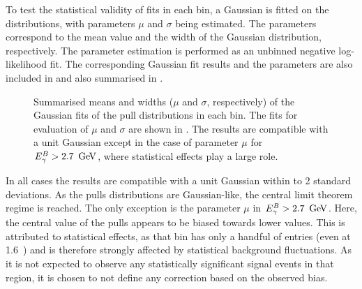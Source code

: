 To test the statistical validity of \Mbc fits in each bin, a Gaussian \PDF is fitted on the distributions, with parameters $\mu$ and $\sigma$ being estimated.
The parameters correspond to the mean value and the width of the Gaussian distribution, respectively.
The parameter estimation is performed as an unbinned negative log-likelihood fit.
The corresponding Gaussian fit results and the parameters are also included in  and also summarised in .
\begin{figure}[htbp!]
    \centering
    \caption{\label{fig:mean_sigma_pulls}Summarised means and widths ($\mu$ and $\sigma$, respectively) of the Gaussian fits of
    the pull distributions in each \EB bin.
    The fits for evaluation of $\mu$ and $\sigma$ are shown in .
    The results are compatible with a unit Gaussian except in the case of parameter $\mu$ for ${E^B_{\gamma}}>2.7~\mathrm{\,Ge\kern -0.1em V}$, where statistical effects play a large role.
    }
\end{figure}

In all cases the results are compatible with a unit Gaussian within to 2 standard deviations.
As the pulls distributions are Gaussian-like, the central limit theorem regime is reached.
The only exception is the parameter $\mu$  in ${E^B_{\gamma}}>2.7~\mathrm{\,Ge\kern -0.1em V}$.
Here, the central value of the pulls appears to be biased towards lower values.
This is attributed to statistical effects, as that bin has only a handful of entries (even at 1.6~\invab) and is therefore strongly affected by statistical background fluctuations.
As it is not expected to observe any statistically significant signal events in that region, it is chosen to not define any correction based on the observed bias.

